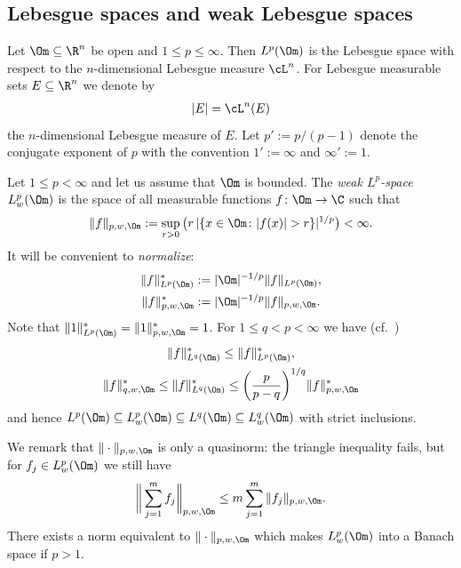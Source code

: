 \subsection{Lebesgue spaces and weak Lebesgue spaces} %

Let $\Om \subseteq \R^n$ be open and $1 \le p \le \infty$.
Then $L^p(\Om)$ is the Lebesgue space with respect to the $n$-dimensional Lebesgue measure $\cL^n$.
For Lebesgue measurable sets $E \subseteq \R^n$ we denote by
\begin{gather*}
 |E| = \cL^n(E)
\end{gather*}
the $n$-dimensional Lebesgue measure of $E$.
Let $p' := p/(p-1)$ denote the conjugate exponent of $p$
with the convention $1' := \infty$ and $\infty' :=1$.

Let $1 \le p < \infty$ and let us assume that $\Om$ is bounded.
The \emph{weak $L^p$-space} $L_w^p(\Om)$ is the space of all measurable functions $f \colon \Om \to \C$ such that
\begin{gather*}
\|f\|_{p,w,\Om} := \sup_{r> 0} \big( r\, |\{x \in \Om \colon |f(x)| > r\}|^{1/p} \big) < \infty.
\end{gather*}
It will be convenient to \emph{normalize}:
\begin{gather*}
 \|f\|^*_{L^p(\Om)} := |\Om|^{-1/p} \|f\|_{L^p(\Om)},\\
 \|f\|^*_{p,w,\Om} := |\Om|^{-1/p} \|f\|_{p,w,\Om}.
\end{gather*}
Note that $\|1\|^*_{L^p(\Om)} = \|1\|^*_{p,w,\Om} =1$.
For $1 \le q < p < \infty$ we have (cf.\ \cite[Exercise\ 1.1.11]{Grafakos08})
\begin{gather}
 \|f\|^*_{L^q(\Om)} \le \|f\|^*_{L^p(\Om)}, \notag \\
 \|f\|^*_{q,w,\Om} \le \|f\|^*_{L^q(\Om)} \le \bigg(\frac{p}{p-q}\bigg)^{1/q}
 \|f\|^*_{p,w,\Om} \label{eq:qp}
\end{gather}
and hence
$L^p(\Om) \subseteq L_w^p(\Om) \subseteq L^q(\Om) \subseteq L_w^q(\Om)$
with strict inclusions.





We remark that $\|\cdot\|_{p,w,\Om}$ is only a quasinorm: the triangle inequality fails, but for
$f_j \in L_w^p(\Om)$
we still have
\begin{gather*}
\bigg\|\sum_{j=1}^m f_j \bigg\|_{p,w,\Om} \le m \sum_{j=1}^m \|f_j\|_{p,w,\Om}.
\end{gather*}
There exists a norm equivalent to $\|\cdot\|_{p,w,\Om}$ which makes $L_w^p(\Om)$ into a Banach space if $p>1$.

